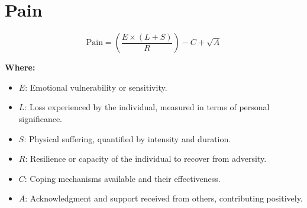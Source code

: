\chapter{Pain}

\begin{equation}
\text{Pain} = \left(\frac{E \times (L + S)}{R}\right) - C + \sqrt{A}
\end{equation}

\textbf{Where:}

\begin{itemize}
    \item $E$: Emotional vulnerability or sensitivity.
    \item $L$: Loss experienced by the individual, measured in terms of personal significance.
    \item $S$: Physical suffering, quantified by intensity and duration.
    \item $R$: Resilience or capacity of the individual to recover from adversity.
    \item $C$: Coping mechanisms available and their effectiveness.
    \item $A$: Acknowledgment and support received from others, contributing positively.
\end{itemize}
